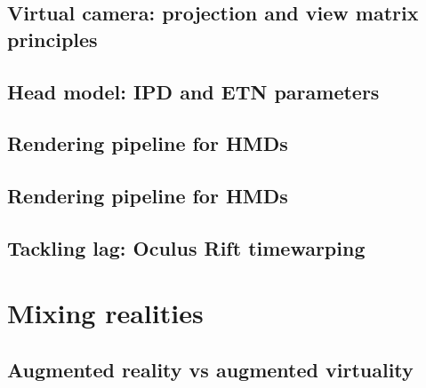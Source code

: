 \subsection{Virtual camera: projection and view matrix principles}

\subsection{Head model: IPD and ETN parameters}

\subsection{Rendering pipeline for HMDs}

\subsection{Rendering pipeline for HMDs}

\subsection{Tackling lag: Oculus Rift timewarping}


\section{Mixing realities}

\subsection{Augmented reality vs augmented virtuality}










